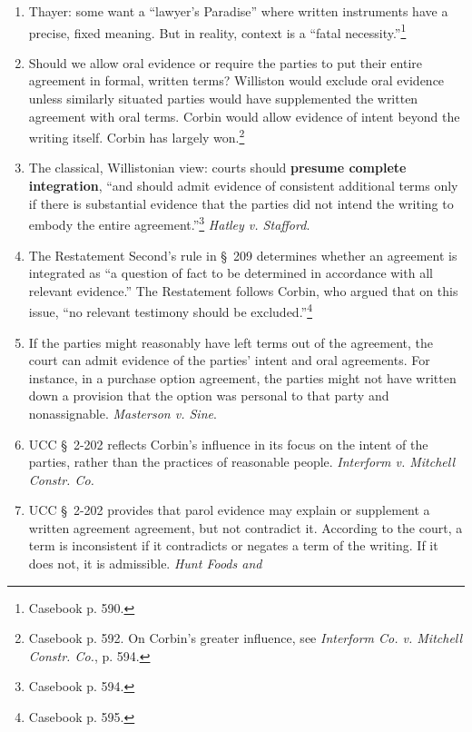 \begin{enumerate}
    \item Thayer: some want a ``lawyer's Paradise'' where written instruments 
    have a precise, fixed meaning. But in reality, context is a ``fatal 
    necessity.''\footnote{Casebook p. 590.} 
    \item Should we allow oral evidence or require the parties to put their 
    entire agreement in formal, written terms? Williston would exclude oral 
    evidence unless similarly situated parties would have supplemented the 
    written agreement with oral terms. Corbin would allow evidence of intent 
    beyond the writing itself. Corbin has largely won.\footnote{Casebook p. 
    592. On Corbin's greater influence, see \emph{Interform Co. v. Mitchell 
    Constr. Co.}, p. 594.}
    \item The classical, Willistonian view: courts should \textbf{presume 
    complete integration}, ``and should admit evidence of consistent 
    additional terms only if there is substantial evidence that the parties 
    did not intend the writing to embody the entire 
    agreement.''\footnote{Casebook p. 594.} \emph{Hatley v. Stafford}.
    \item The Restatement Second's rule in \S\ 209 determines  whether an 
    agreement is integrated as ``a question of fact to be determined in 
    accordance with all relevant evidence.'' The Restatement follows Corbin, 
    who argued that on this issue, ``no relevant testimony should be 
    excluded.''\footnote{Casebook p. 595.}
    \item If the parties might reasonably have left terms out of the 
    agreement, the court can admit evidence of the parties' intent and oral 
    agreements. For instance, in a purchase option agreement, the parties 
    might not have written down a provision that the option was personal to 
    that party and nonassignable. \emph{Masterson v. Sine}.
    \item UCC \S\ 2-202 reflects Corbin's influence in its focus on the intent 
    of the parties, rather than the practices of reasonable people. 
    \emph{Interform v. Mitchell Constr. Co.}
    \item UCC \S\ 2-202 provides that parol evidence may explain or supplement 
    a written agreement agreement, but not contradict it. According to the 
    court, a term is inconsistent if it contradicts or negates a term of the 
    writing. If it does not, it is admissible. \emph{Hunt Foods and 
}
\end{enumerate}
